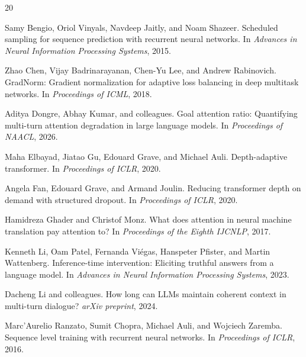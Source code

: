 \documentclass[11pt,a4paper]{article}
\begin{document}


\begin{thebibliography}{20}

Samy Bengio, Oriol Vinyals, Navdeep Jaitly, and Noam Shazeer.
\newblock Scheduled sampling for sequence prediction with recurrent neural networks.
\newblock In \emph{Advances in Neural Information Processing Systems}, 2015.

Zhao Chen, Vijay Badrinarayanan, Chen-Yu Lee, and Andrew Rabinovich.
\newblock GradNorm: Gradient normalization for adaptive loss balancing in deep multitask networks.
\newblock In \emph{Proceedings of ICML}, 2018.

Aditya Dongre, Abhay Kumar, and colleagues.
\newblock Goal attention ratio: Quantifying multi-turn attention degradation in large language models.
\newblock In \emph{Proceedings of NAACL}, 2026.

Maha Elbayad, Jiatao Gu, Edouard Grave, and Michael Auli.
\newblock Depth-adaptive transformer.
\newblock In \emph{Proceedings of ICLR}, 2020.

Angela Fan, Edouard Grave, and Armand Joulin.
\newblock Reducing transformer depth on demand with structured dropout.
\newblock In \emph{Proceedings of ICLR}, 2020.

Hamidreza Ghader and Christof Monz.
\newblock What does attention in neural machine translation pay attention to?
\newblock In \emph{Proceedings of the Eighth IJCNLP}, 2017.

Kenneth Li, Oam Patel, Fernanda Vi{\'e}gas, Hanspeter Pfister, and Martin Wattenberg.
\newblock Inference-time intervention: Eliciting truthful answers from a language model.
\newblock In \emph{Advances in Neural Information Processing Systems}, 2023.

Dacheng Li and colleagues.
\newblock How long can LLMs maintain coherent context in multi-turn dialogue?
\newblock \emph{arXiv preprint}, 2024.

Marc'Aurelio Ranzato, Sumit Chopra, Michael Auli, and Wojciech Zaremba.
\newblock Sequence level training with recurrent neural networks.
\newblock In \emph{Proceedings of ICLR}, 2016.


\end{thebibliography}
\end{document}
